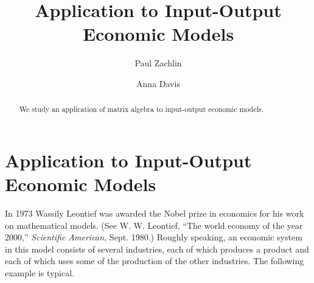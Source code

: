 \documentclass{ximera}
\author{Paul Zachlin \and Anna Davis} \title{Application to Input-Output Economic Models} \license{CC-BY 4.0}
\begin{document}
\begin{abstract}
 We study an application of matrix algebra to input-output economic models.
\end{abstract}
\maketitle

\section*{Application to Input-Output Economic Models}
In 1973 Wassily Leontief was awarded the Nobel prize in economics for his work on mathematical models.  (See W. W. Leontief, ``The world economy of the year 2000,'' \textit{Scientific American,} Sept. 1980.) Roughly speaking, an economic system in this model consists of several industries, each of which produces a product and each of which uses some of the production of the other industries. The following example is typical.
\end{document}
